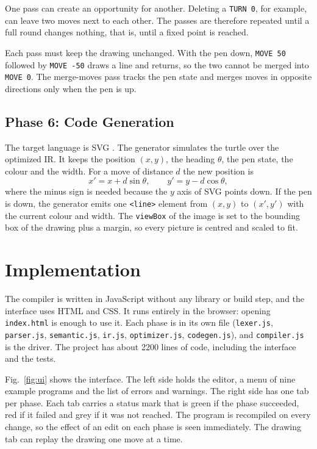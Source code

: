 \documentclass[conference]{IEEEtran}
\newcommand{\kw}[1]{\texttt{#1}}
\begin{document}
One pass can create an opportunity for another. Deleting a \kw{TURN 0}, for example, can leave two moves next to each other. The passes are therefore repeated until a full round changes nothing, that is, until a fixed point is reached.

Each pass must keep the drawing unchanged. With the pen down, \kw{MOVE 50} followed by \kw{MOVE -50} draws a line and returns, so the two cannot be merged into \kw{MOVE 0}. The merge-moves pass tracks the pen state and merges moves in opposite directions only when the pen is up.

\subsection{Phase 6: Code Generation}
The target language is SVG \cite{svg}. The generator simulates the turtle over the optimized IR. It keeps the position $(x, y)$, the heading $\theta$, the pen state, the colour and the width. For a move of distance $d$ the new position is
\begin{equation}
x' = x + d\sin\theta, \qquad y' = y - d\cos\theta,
\end{equation}
where the minus sign is needed because the $y$ axis of SVG points down. If the pen is down, the generator emits one \kw{<line>} element from $(x, y)$ to $(x', y')$ with the current colour and width. The \kw{viewBox} of the image is set to the bounding box of the drawing plus a margin, so every picture is centred and scaled to fit.

\section{Implementation}\label{sec:impl}
The compiler is written in JavaScript without any library or build step, and the interface uses HTML and CSS. It runs entirely in the browser: opening \kw{index.html} is enough to use it. Each phase is in its own file (\kw{lexer.js}, \kw{parser.js}, \kw{semantic.js}, \kw{ir.js}, \kw{optimizer.js}, \kw{codegen.js}), and \kw{compiler.js} is the driver. The project has about 2200 lines of code, including the interface and the tests.

Fig.~\ref{fig:ui} shows the interface. The left side holds the editor, a menu of nine example programs and the list of errors and warnings. The right side has one tab per phase. Each tab carries a status mark that is green if the phase succeeded, red if it failed and grey if it was not reached. The program is recompiled on every change, so the effect of an edit on each phase is seen immediately. The drawing tab can replay the drawing one move at a time.
\end{document}
